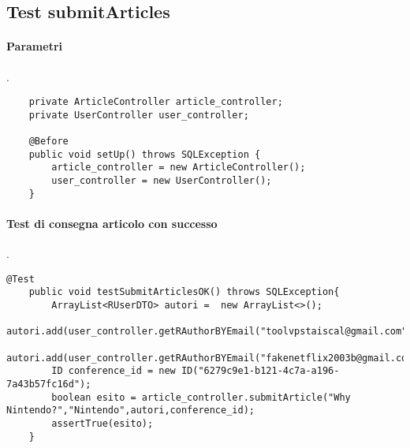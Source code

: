 \subsection{Test submitArticles}
\paragraph{Parametri}
.
\begin{lstlisting}
    private ArticleController article_controller;
    private UserController user_controller;

    @Before
    public void setUp() throws SQLException {
        article_controller = new ArticleController();
        user_controller = new UserController();
    }
\end{lstlisting}
\paragraph{Test di consegna articolo con successo}
.
\begin{lstlisting}
@Test
    public void testSubmitArticlesOK() throws SQLException{
        ArrayList<RUserDTO> autori =  new ArrayList<>();
        autori.add(user_controller.getRAuthorBYEmail("toolvpstaiscal@gmail.com"));
        autori.add(user_controller.getRAuthorBYEmail("fakenetflix2003b@gmail.com"));
        ID conference_id = new ID("6279c9e1-b121-4c7a-a196-7a43b57fc16d");
        boolean esito = article_controller.submitArticle("Why Nintendo?","Nintendo",autori,conference_id);
        assertTrue(esito);
    }
\end{lstlisting}
